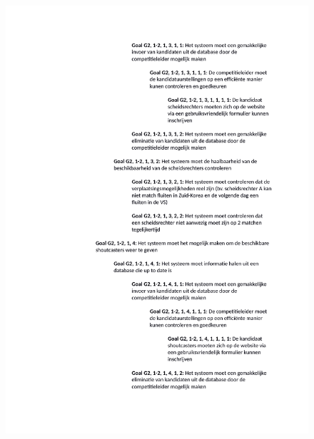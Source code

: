 \documentclass[12pt,a4paper]{article}
\begin{document}
			\begin{figure}[H]
				\includegraphics[width=\textwidth]{../2-Doelen/Goals3.pdf}
			\end{figure}
\end{document}
